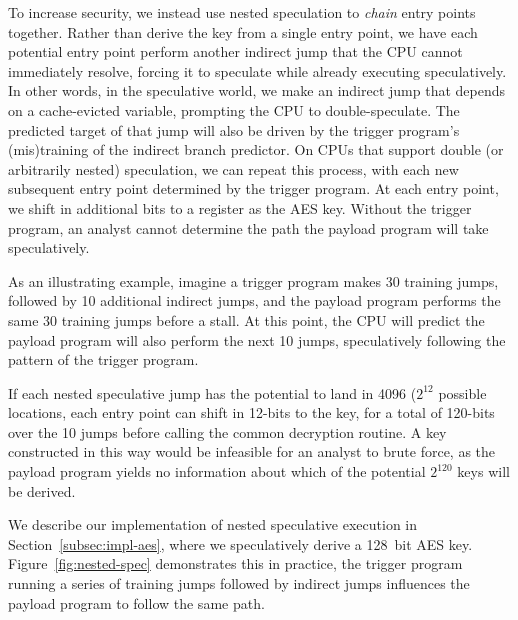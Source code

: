 To increase security,
we instead use nested speculation to \emph{chain} entry
points together. Rather than derive the key from a single entry point, we have
each potential entry point perform another indirect jump that the CPU cannot
immediately resolve, forcing it to speculate while already executing
speculatively. In other words, in the speculative world, we make an
indirect jump that depends on a cache-evicted variable, prompting the CPU to double-speculate.
The predicted target of that jump will also be driven by the
trigger program's (mis)training of the indirect branch predictor.
On CPUs that support double (or arbitrarily nested)
speculation, we can repeat this process, with each new subsequent entry point
determined by the trigger program. At each entry point, we shift in additional
bits to a register as the AES key. Without the trigger program, an analyst
cannot determine the path the payload program will take speculatively.

%

As an illustrating example,
imagine a trigger program makes 30 training jumps, followed by 10
additional indirect jumps, and the payload program performs the same 30 training
jumps before a stall. At this point,
the CPU will predict the payload program will also perform
the next 10 jumps, speculatively following the pattern of the trigger program.


If each nested speculative jump has the potential to land in 4096 ($2^{12}$ possible locations,
each
entry point can shift in 12-bits to the key, for a total of 120-bits over the
10 jumps before calling the common decryption routine. A key constructed in this
way would be infeasible
for an analyst to brute force, as the payload program yields no information
about which of the potential $2^{120}$ keys will be derived.

We describe our implementation of nested speculative execution in
Section~\ref{subsec:impl-aes}, where we speculatively derive a 128~bit AES key.
Figure~\ref{fig:nested-spec} demonstrates this in practice, the trigger program
running a series of training jumps followed by indirect jumps influences the
payload program to follow the same path.

